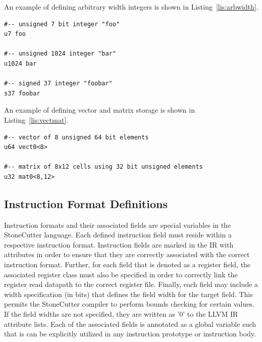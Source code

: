 \documentclass{article}
\begin{document}
An example of defining arbitrary width integers is shown in Listing~\ref{lis:arbwidth}.  

\vspace{0.125in}
\begin{lstlisting}[frame=single,style=base,caption={Arbitrary Width Datatypes},captionpos=b,label={lis:arbwidth}]
#-- unsigned 7 bit integer "foo"
u7 foo

#-- unsigned 1024 integer "bar"
u1024 bar

#-- signed 37 integer "foobar"
s37 foobar
\end{lstlisting}

An example of defining vector and matrix storage is shown in Listing~\ref{lis:vectmat}.
\vspace{0.125in}
\begin{lstlisting}[frame=single,style=base,caption={Vector and Matrix Datatypes},captionpos=b,label={lis:vectmat}]
#-- vector of 8 unsigned 64 bit elements
u64 vect0<8>

#-- matrix of 8x12 cells using 32 bit unsigned elements
u32 mat0<8,12>
\end{lstlisting}

\clearpage
\subsection{Instruction Format Definitions}
\label{sec:InstFormatDef}

Instruction formats and their associated fields are special variables in the StoneCutter language.  Each defined 
instruction field must reside within a respective instruction format.  Instruction fields are marked in the IR with 
attributes in order to ensure that they are correctly associated with the correct instruction format.  Further, for each 
field that is denoted as a register field, the associated register class must also be specified in order to correctly 
link the register read datapath to the correct register file.  Finally, each field may include a width specification 
(in bits) that defines the field width for the target field.  This permits the StoneCutter compiler to perform bounds checking 
for certain values.  If the field widths are not specified, they are written as '0' to the LLVM IR attribute lists.  Each of the associated fields is annotated as a global 
variable such that is can be explicitly utilized in any instruction prototype or instruction body.  
\end{document}
